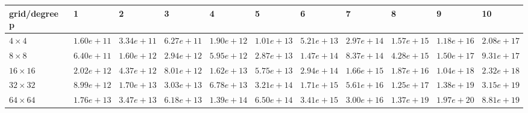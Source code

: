 \begin{tabular}{lllllllllll}
\hline
 grid/degree p   & 1          & 2          & 3          & 4          & 5          & 6          & 7          & 8          & 9          & 10         \\
\hline
 $4 \times 4$    & $1.60e+11$ & $3.34e+11$ & $6.27e+11$ & $1.90e+12$ & $1.01e+13$ & $5.21e+13$ & $2.97e+14$ & $1.57e+15$ & $1.18e+16$ & $2.08e+17$ \\
 $8 \times 8$    & $6.40e+11$ & $1.60e+12$ & $2.94e+12$ & $5.95e+12$ & $2.87e+13$ & $1.47e+14$ & $8.37e+14$ & $4.28e+15$ & $1.50e+17$ & $9.31e+17$ \\
 $16 \times 16$  & $2.02e+12$ & $4.37e+12$ & $8.01e+12$ & $1.62e+13$ & $5.75e+13$ & $2.94e+14$ & $1.66e+15$ & $1.87e+16$ & $1.04e+18$ & $2.32e+18$ \\
 $32 \times 32$  & $8.99e+12$ & $1.70e+13$ & $3.03e+13$ & $6.78e+13$ & $3.21e+14$ & $1.71e+15$ & $5.61e+16$ & $1.25e+17$ & $1.38e+19$ & $3.15e+19$ \\
 $64 \times 64$  & $1.76e+13$ & $3.47e+13$ & $6.18e+13$ & $1.39e+14$ & $6.50e+14$ & $3.41e+15$ & $3.00e+16$ & $1.37e+19$ & $1.97e+20$ & $8.81e+19$ \\
\hline
\end{tabular}